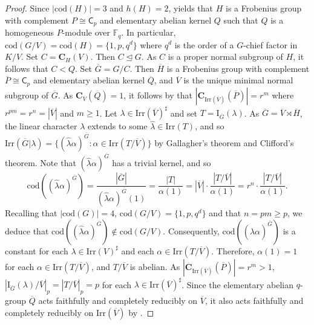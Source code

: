 \documentclass[9pt]{article}
\begin{document}
\begin{proof}
	Since $|\mathrm{cod}(H)|=3$ and $h(H)=2$,
	\cite[Corollary B]{qian2023} yields that $H$ is a Frobenius group with complement $P\cong \mathsf{C}_{p}$
	and elementary abelian kernel $Q$ such that $Q$ is a homogeneous $P$-module over $\mathbb{F}_q$.
	In particular, $\mathrm{cod}(G/V)=\mathrm{cod}(H)=\{ 1,p,q^{d} \}$ where $q^{d}$ is the order of a $G$-chief factor in $K/V$.
    Set $C=\mathbf{C}_{H}(V)$.
	Then $C\unlhd G$.
	As $C$ is a proper normal subgroup of $H$, it follows that $C<Q$.
    Set $\overline{G}=G/C$.
    Then $\overline{H}$ is a Frobenius group with complement $\overline{P}\cong \mathsf{C}_{p}$
	and elementary abelian kernel $\overline{Q}$,
	and $\overline{V}$ is the unique minimal normal subgroup of $\overline{G}$.
    As $\mathbf{C}_{\overline{V}}(\overline{Q})=1$,
    it follows by \cite[Theorem 15.16]{isaacs1994} that $|\mathbf{C}_{\mathrm{Irr}(\overline{V})}(\overline{P})|=r^{m}$
	where $r^{pm}=r^{n}=|\overline{V}|$ and $m\geq 1$.
Let $\lambda\in \mathrm{Irr}(\overline{V})^\sharp$ and set $T=\mathrm{I}_{\overline{G}}(\lambda)$.
	As $\overline{G}=\overline{V} \rtimes \overline{H}$,
	the linear character $\lambda$ extends to some $\hat{\lambda}\in \mathrm{Irr}(T)$, 
	and so $\mathrm{Irr}(\overline{G}|\lambda)=\{ (\hat{\lambda} \alpha)^{\overline{G}}: \alpha \in \mathrm{Irr}(T/\overline{V}) \}$ by Gallagher's theorem and Clifford's theorem.
	Note that $(\hat{\lambda} \alpha)^{\overline{G}}$ has a trivial kernel, and so
	\[
		\mathrm{cod}((\hat{\lambda} \alpha)^{\overline{G}})=\frac{|\overline{G}|}{(\hat{\lambda} \alpha)^{\overline{G}}(1)}=\frac{|T|}{\alpha(1)}=|\overline{V}|\cdot \frac{|T/\overline{V}|}{\alpha(1)}=r^{n}\cdot \frac{|T/\overline{V}|}{\alpha(1)}.
	\] 
    Recalling that $|\mathrm{cod}(G)|=4$, $\mathrm{cod}(G/V)=\{ 1,p,q^{d} \}$ and that $n=pm\geq p$,
	we deduce that $\mathrm{cod}((\hat{\lambda} \alpha)^{\overline{G}})\notin \mathrm{cod}(G/V)$.
	Consequently, $\mathrm{cod}((\hat{\lambda} \alpha)^{\overline{G}})$
    is a constant for each $\lambda\in \mathrm{Irr}(V)^\sharp$ and each $\alpha\in \mathrm{Irr}(T/\overline{V})$.
	Therefore, $\alpha(1)=1$ for each $\alpha \in \mathrm{Irr}(T/\overline{V})$,
	and $T/\overline{V}$ is abelian.
	As $|\mathbf{C}_{\mathrm{Irr}(\overline{V})}(\overline{P})|=r^{m}>1$,
	$|\mathrm{I}_{\overline{G}}(\lambda)/\overline{V}|_p=|T/\overline{V}|_p=p$ for each $\lambda\in \mathrm{Irr}(\overline{V})^\sharp$.
    Since the elementary abelian $q$-group $\overline{Q}$ acts faithfully and completely reducibly on $\overline{V}$,
	it also acts faithfully and completely reducibly on $\mathrm{Irr}(\overline{V})$ by \cite[Lemma 1]{zhang2000}.

\end{proof}
\end{document}
